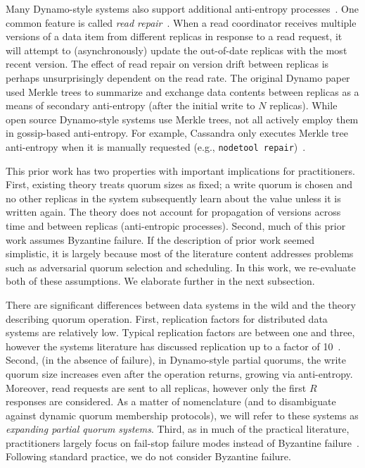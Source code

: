\documentclass{vldb}
\begin{document}
Many Dynamo-style systems also support additional anti-entropy
processes~\cite{nosql}.  One common feature is called \textit{read
  repair}~\cite{dynamo}.  When a read coordinator receives multiple
versions of a data item from different replicas in response to a read
request, it will attempt to (asynchronously) update the out-of-date
replicas with the most recent version.  The effect of read repair on
version drift between replicas is perhaps unsurprisingly dependent on
the read rate.  The original Dynamo paper used Merkle trees to
summarize and exchange data contents between replicas as a means of
secondary anti-entropy (after the initial write to $N$ replicas).
While open source Dynamo-style systems use Merkle trees, not all
actively employ them in gossip-based anti-entropy.  For example,
Cassandra only executes Merkle tree anti-entropy when it is manually
requested (e.g., \texttt{nodetool repair})~\cite{cassandra-merkle}.

This prior work has two properties with important implications for
practitioners.  First, existing theory treats quorum sizes as fixed; a
write quorum is chosen and no other replicas in the system
subsequently learn about the value unless it is written again.  The
theory does not account for propagation of versions across time and
between replicas (anti-entropic processes).  Second, much of this
prior work assumes Byzantine failure.  If the description of prior
work seemed simplistic, it is largely because most of the literature
content addresses problems such as adversarial quorum selection and
scheduling.  In this work, we re-evaluate both of these assumptions.
We elaborate further in the next subsection.


There are significant differences between data systems in the wild and
the theory describing quorum operation.  First, replication factors
for distributed data systems are relatively low.  Typical replication
factors are between one and three, however the systems literature has
discussed replication up to a factor of 10~\cite{chain-replication}.
Second, (in the absence of failure), in Dynamo-style partial quorums,
the write quorum size increases even after the operation returns,
growing via anti-entropy.  Moreover, read requests are sent to all
replicas, however only the first $R$ responses are considered.  As a
matter of nomenclature (and to disambiguate against dynamic quorum
membership protocols), we will refer to these systems as
\textit{expanding partial quorum systems}.  Third, as in much of the
practical literature, practitioners largely focus on fail-stop failure
modes instead of Byzantine failure~\cite{birman-byzantine}.
Following standard practice, we do not consider Byzantine failure.
\end{document}
